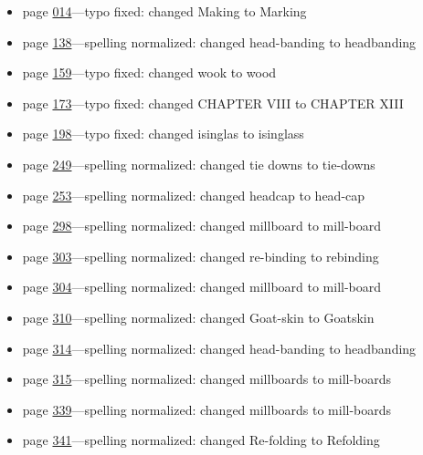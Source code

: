 \documentclass[
]{article}
\providecommand{\tightlist}{%
  \setlength{\itemsep}{0pt}\setlength{\parskip}{0pt}}
\begin{document}
\begin{itemize}
\tightlist
\item
  page \protect\hyperlink{Page_14}{014}---typo fixed: changed
  \textquotesingle Making\textquotesingle{} to
  \textquotesingle Marking\textquotesingle{}
\item
  page \protect\hyperlink{Page_138}{138}---spelling normalized: changed
  \textquotesingle head-banding\textquotesingle{} to
  \textquotesingle headbanding\textquotesingle{}
\item
  page \protect\hyperlink{Page_159}{159}---typo fixed: changed
  \textquotesingle wook\textquotesingle{} to
  \textquotesingle wood\textquotesingle{}
\item
  page \protect\hyperlink{Page_173}{173}---typo fixed: changed
  \textquotesingle CHAPTER VIII\textquotesingle{} to
  \textquotesingle CHAPTER XIII\textquotesingle{}
\item
  page \protect\hyperlink{Page_198}{198}---typo fixed: changed
  \textquotesingle isinglas\textquotesingle{} to
  \textquotesingle isinglass\textquotesingle{}
\item
  page \protect\hyperlink{Page_249}{249}---spelling normalized: changed
  \textquotesingle tie downs\textquotesingle{} to
  \textquotesingle tie-downs\textquotesingle{}
\item
  page \protect\hyperlink{Page_253}{253}---spelling normalized: changed
  \textquotesingle headcap\textquotesingle{} to
  \textquotesingle head-cap\textquotesingle{}
\item
  page \protect\hyperlink{Page_298}{298}---spelling normalized: changed
  \textquotesingle millboard\textquotesingle{} to
  \textquotesingle mill-board\textquotesingle{}
\item
  page \protect\hyperlink{Page_303}{303}---spelling normalized: changed
  \textquotesingle re-binding\textquotesingle{} to
  \textquotesingle rebinding\textquotesingle{}
\item
  page \protect\hyperlink{Page_304}{304}---spelling normalized: changed
  \textquotesingle millboard\textquotesingle{} to
  \textquotesingle mill-board\textquotesingle{}
\item
  page \protect\hyperlink{Page_310}{310}---spelling normalized: changed
  \textquotesingle Goat-skin\textquotesingle{} to
  \textquotesingle Goatskin\textquotesingle{}
\item
  page \protect\hyperlink{Page_314}{314}---spelling normalized: changed
  \textquotesingle head-banding\textquotesingle{} to
  \textquotesingle headbanding\textquotesingle{}
\item
  page \protect\hyperlink{Page_315}{315}---spelling normalized: changed
  \textquotesingle millboards\textquotesingle{} to
  \textquotesingle mill-boards\textquotesingle{}
\item
  page \protect\hyperlink{Page_339}{339}---spelling normalized: changed
  \textquotesingle millboards\textquotesingle{} to
  \textquotesingle mill-boards\textquotesingle{}
\item
  page \protect\hyperlink{Page_341}{341}---spelling normalized: changed
  \textquotesingle Re-folding\textquotesingle{} to
  \textquotesingle Refolding\textquotesingle{}
\end{itemize}
\end{document}
